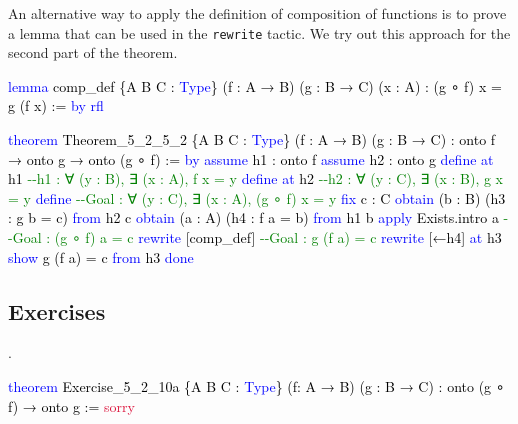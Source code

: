 \documentclass[
  letterpaper,
  DIV=11,
  numbers=noendperiod]{scrreprt}
\newenvironment{Shaded}{\begin{snugshade}}{\end{snugshade}}
\newcommand{\CommentTok}[1]{\textcolor[rgb]{0.37,0.37,0.37}{#1}}
\newcommand{\ConstantTok}[1]{\textcolor[rgb]{0.56,0.35,0.01}{#1}}
\newcommand{\KeywordTok}[1]{\textcolor[rgb]{0.00,0.23,0.31}{#1}}
\newcommand{\NormalTok}[1]{\textcolor[rgb]{0.00,0.23,0.31}{#1}}
\renewcommand{\NormalTok}[1]{\textcolor[HTML]{000000}{#1}}
\renewcommand{\KeywordTok}[1]{\textcolor[HTML]{0000FF}{#1}}
\renewcommand{\CommentTok}[1]{\textcolor[HTML]{008000}{#1}}
\renewcommand{\ConstantTok}[1]{\textcolor[HTML]{DC143C}{#1}}
\newcommand{\nobreakShaded}{\renewenvironment{Shaded}
	{\begin{tcolorbox}[frame hidden, enhanced, interior hidden, boxrule=0pt,
		borderline west={3pt}{0pt}{shadecolor}, sharp corners]}
	{\end{tcolorbox}}}
\newenvironment{numex}[1]
	{\begin{minipage}[t]{0.04\textwidth}\vspace{8pt}{#1}.
		\end{minipage}\nobreakShaded\begin{minipage}[t]{0.96\textwidth}\vspace{0pt}}
	{\end{minipage}}
\theoremstyle{remark}
\begin{document}
An alternative way to apply the definition of composition of functions
is to prove a lemma that can be used in the \texttt{rewrite} tactic. We
try out this approach for the second part of the theorem.

\begin{Shaded}
\begin{Highlighting}[]
\KeywordTok{lemma}\NormalTok{ comp\_def \{A B C : }\KeywordTok{Type}\NormalTok{\} (f : A → B) (g : B → C) (x : A) :}
\NormalTok{    (g ∘ f) x = g (f x) := }\KeywordTok{by} \KeywordTok{rfl}

\KeywordTok{theorem}\NormalTok{ Theorem\_5\_2\_5\_2 \{A B C : }\KeywordTok{Type}\NormalTok{\} (f : A → B) (g : B → C) :}
\NormalTok{    onto f → onto g → onto (g ∘ f) := }\KeywordTok{by}
  \KeywordTok{assume}\NormalTok{ h1 : onto f}
  \KeywordTok{assume}\NormalTok{ h2 : onto g}
  \KeywordTok{define} \KeywordTok{at}\NormalTok{ h1           }\CommentTok{{-}{-}h1 : ∀ (y : B), ∃ (x : A), f x = y}
  \KeywordTok{define} \KeywordTok{at}\NormalTok{ h2           }\CommentTok{{-}{-}h2 : ∀ (y : C), ∃ (x : B), g x = y}
  \KeywordTok{define}                 \CommentTok{{-}{-}Goal : ∀ (y : C), ∃ (x : A), (g ∘ f) x = y}
  \KeywordTok{fix}\NormalTok{ c : C}
  \KeywordTok{obtain}\NormalTok{ (b : B) (h3 : g b = c) }\KeywordTok{from}\NormalTok{ h2 c}
  \KeywordTok{obtain}\NormalTok{ (a : A) (h4 : f a = b) }\KeywordTok{from}\NormalTok{ h1 b}
  \KeywordTok{apply}\NormalTok{ Exists.intro a   }\CommentTok{{-}{-}Goal : (g ∘ f) a = c}
  \KeywordTok{rewrite}\NormalTok{ [comp\_def]     }\CommentTok{{-}{-}Goal : g (f a) = c}
  \KeywordTok{rewrite}\NormalTok{ [←h4] }\KeywordTok{at}\NormalTok{ h3}
  \KeywordTok{show}\NormalTok{ g (f a) = c }\KeywordTok{from}\NormalTok{ h3}
  \KeywordTok{done}
\end{Highlighting}
\end{Shaded}

\hypertarget{exercises-11}{%
\subsection{Exercises}\label{exercises-11}}

\begin{numex}{1}

\begin{Shaded}
\begin{Highlighting}[]
\KeywordTok{theorem}\NormalTok{ Exercise\_5\_2\_10a \{A B C : }\KeywordTok{Type}\NormalTok{\} (f: A → B) (g : B → C) :}
\NormalTok{    onto (g ∘ f) → onto g := }\ConstantTok{sorry}
\end{Highlighting}
\end{Shaded}

\end{numex}
\end{document}
